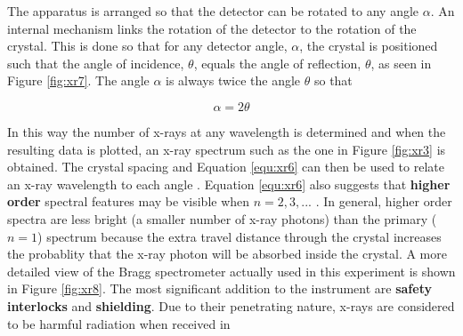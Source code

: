 The apparatus is arranged so that the detector can be rotated to any angle $\alpha$. An internal mechanism links the rotation of the detector to the rotation of the crystal. This is done so that for any detector angle, $\alpha$, the crystal is positioned such that the angle of incidence, $\theta$, equals the angle of reflection, $\theta$, as seen in Figure \ref{fig:xr7}. The angle $\alpha$ is always twice the angle $\theta$ so that

\begin{equation}
\alpha=2\theta
\label{equ:xr7}
\end{equation}

\noindent In this way the number of x-rays at any wavelength is determined and when the resulting data is plotted, an x-ray spectrum such as the one in Figure \ref{fig:xr3} is obtained. The crystal spacing and Equation \ref{equ:xr6} can then be used to relate an x-ray wavelength to each angle . Equation \ref{equ:xr6} also suggests that {\bf higher order} spectral features may be visible when $n = 2, 3,...$ . In general, higher order spectra are less bright (a smaller number of x-ray photons) than the primary ($n=1$) spectrum because the extra travel distance through the crystal increases the probablity that the x-ray photon will be absorbed inside the crystal.
	A more detailed view of the Bragg spectrometer actually used in this experiment is shown in Figure \ref{fig:xr8}. The most significant addition to the instrument are {\bf safety interlocks} and {\bf shielding}. Due to their penetrating nature, x-rays are considered to be harmful radiation when received in

